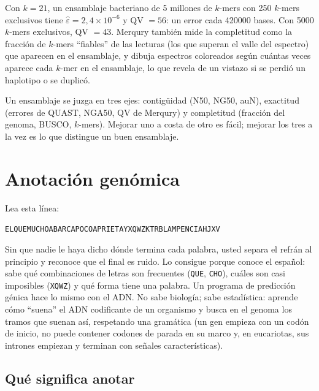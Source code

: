 Con $k=21$, un ensamblaje bacteriano de 5 millones de $k$-mers con 250 $k$-mers exclusivos tiene $\widehat{\varepsilon}=2{,}4\times10^{-6}$ y QV $=56$: un error cada \num{420000} bases. Con \num{5000} $k$-mers exclusivos, QV $=43$. Merqury también mide la completitud como la fracción de $k$-mers ``fiables'' de las lecturas (los que superan el valle del espectro) que aparecen en el ensamblaje, y dibuja espectros coloreados según cuántas veces aparece cada $k$-mer en el ensamblaje, lo que revela de un vistazo si se perdió un haplotipo o se duplicó.

\begin{ideaclave}
Un ensamblaje se juzga en tres ejes: contigüidad (N50, NG50, auN), exactitud (errores de QUAST, NGA50, QV de Merqury) y completitud (fracción del genoma, BUSCO, $k$-mers). Mejorar uno a costa de otro es fácil; mejorar los tres a la vez es lo que distingue un buen ensamblaje.
\end{ideaclave}

\section{Anotación genómica}\label{sec:08-anotacion}

\begin{intuicion}
Lea esta línea:\par\centerline{\texttt{ELQUEMUCHOABARCAPOCOAPRIETAYXQWZKTRBLAMPENCIAHJXV}}\noindent Sin que nadie le haya dicho dónde termina cada palabra, usted separa el refrán al principio y reconoce que el final es ruido. Lo consigue porque conoce el español: sabe qué combinaciones de letras son frecuentes (\texttt{QUE}, \texttt{CHO}), cuáles son casi imposibles (\texttt{XQWZ}) y qué forma tiene una palabra. Un programa de predicción génica hace lo mismo con el ADN. No sabe biología; sabe estadística: aprende cómo ``suena'' el ADN codificante de un organismo y busca en el genoma los tramos que suenan así, respetando una gramática (un gen empieza con un codón de inicio, no puede contener codones de parada en su marco y, en eucariotas, sus intrones empiezan y terminan con señales características).
\end{intuicion}

\subsection{Qué significa anotar}

